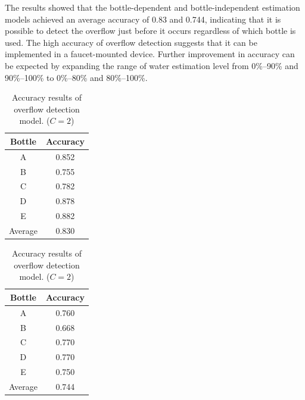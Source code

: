 \documentclass[sigconf]{acmart}
\begin{document}
The results showed that the bottle-dependent and bottle-independent estimation models achieved an average accuracy of 0.83 and 0.744, indicating that it is possible to detect the overflow just before it occurs regardless of which bottle is used. The high accuracy of overflow detection suggests that it can be implemented in a faucet-mounted device. Further improvement in accuracy can be expected by expanding the range of water estimation level from 0\%--90\% and 90\%--100\% to 0\%--80\% and 80\%--100\%.

\begin{table}[!t]
  \centering
  \caption{Accuracy results of overflow detection model. ($C=2$)}
  \begin{minipage}[t]{0.45\linewidth}
    \centering
    \begin{tabular}{c|c} \hline\hline
    Bottle & Accuracy \\ \hline
    A & 0.852 \\
    B & 0.755 \\
    C & 0.782 \\
    D & 0.878 \\
    E & 0.882 \\ \hline
    Average & 0.830 \\ \hline
    \end{tabular}
    \label{tab:result_2_dependent}
  \end{minipage}
  \begin{minipage}[t]{0.45\linewidth}
    \centering
    \begin{tabular}{c|c} \hline\hline
    Bottle & Accuracy \\ \hline
    A & 0.760 \\
    B & 0.668 \\
    C & 0.770 \\
    D & 0.770 \\
    E & 0.750 \\ \hline
    Average & 0.744 \\ \hline
    \end{tabular}
    \label{tab:result_2_independent}
  \end{minipage}
  \label{tab:result_2}
\end{table}



\end{document}
